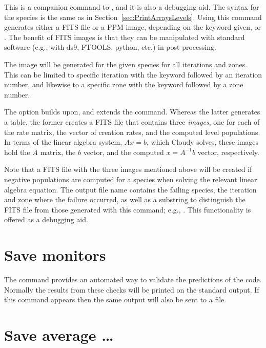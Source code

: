 This is a companion command to , and it is also a
debugging aid.
The syntax for the species is the same as in Section~\ref{sec:PrintArraysLevels}.
Using this command generates either a FITS file or a PPM image, depending on the
keyword given,  or .
The benefit of FITS images is that they can be manipulated with standard
software (e.g., with ds9, FTOOLS, python, etc.) in post-processing.

The image will be generated for the given species for all iterations and zones.
This can be limited to specific iteration with the keyword
 followed by an iteration number, and likewise to
a specific zone with the keyword  followed by a zone number.

The  option builds upon, and extends the 
command.
Whereas the latter generates a table, the former creates a FITS file that
contains three {\it images}, one for each of the rate matrix, the vector of
creation rates, and the computed level populations.
In terms of the linear algebra system, $A x = b$, which Cloudy solves, these
images hold the $A$ matrix, the $b$ vector, and the computed $x = A^{-1} b$
vector, respectively.

Note that a FITS file with the three images mentioned above will be created if
negative populations are computed for a species when solving the relevant linear
algebra equation.
The output file name contains the failing species, the iteration and zone where
the failure occurred, as well as a substring to distinguish the FITS file from
those generated with this command; e.g.,
.
This functionality is offered as a debugging aid.

\section{Save monitors}
\label{sec:SaveMonitorsCommand}

The  command provides
an automated way to validate the predictions of the code.
Normally the
results from these checks will be printed on the standard output.
If this
command appears then the same output will also be sent to a file.

\section{Save average \dots}
\label{sec:CommandSaveAverage}

